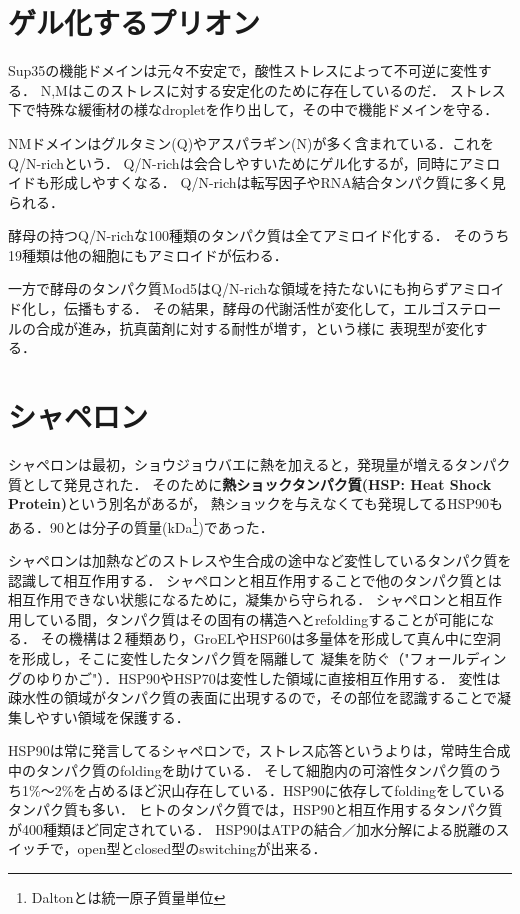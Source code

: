 \documentclass[uplatex, dvipdfmx]{jsreport}
\begin{document}
\section{ゲル化するプリオン}

Sup35の機能ドメインは元々不安定で，酸性ストレスによって不可逆に変性する．
N,Mはこのストレスに対する安定化のために存在しているのだ．
ストレス下で特殊な緩衝材の様なdropletを作り出して，その中で機能ドメインを守る．

\begin{definition}[Q/N-rich]
    NMドメインはグルタミン(Q)やアスパラギン(N)が多く含まれている．これをQ/N-richという．
    Q/N-richは会合しやすいためにゲル化するが，同時にアミロイドも形成しやすくなる．
    Q/N-richは転写因子やRNA結合タンパク質に多く見られる．
\end{definition}
\begin{example}
    酵母の持つQ/N-richな100種類のタンパク質は全てアミロイド化する．
    そのうち19種類は他の細胞にもアミロイドが伝わる．
\end{example}
\begin{example}
    一方で酵母のタンパク質Mod5はQ/N-richな領域を持たないにも拘らずアミロイド化し，伝播もする．
    その結果，酵母の代謝活性が変化して，エルゴステロールの合成が進み，抗真菌剤に対する耐性が増す，という様に
    表現型が変化する．
\end{example}

\section{シャペロン}

シャペロンは最初，ショウジョウバエに熱を加えると，発現量が増えるタンパク質として発見された．
そのために\textbf{熱ショックタンパク質(HSP: Heat Shock Protein)}という別名があるが，
熱ショックを与えなくても発現してるHSP90もある．90とは分子の質量(kDa\footnote{Daltonとは統一原子質量単位})であった．

\begin{definition}[chaperone]
    シャペロンは加熱などのストレスや生合成の途中など変性しているタンパク質を認識して相互作用する．
    シャペロンと相互作用することで他のタンパク質とは相互作用できない状態になるために，凝集から守られる．
    シャペロンと相互作用している間，タンパク質はその固有の構造へとrefoldingすることが可能になる．
    その機構は２種類あり，GroELやHSP60は多量体を形成して真ん中に空洞を形成し，そこに変性したタンパク質を隔離して
    凝集を防ぐ（"フォールディングのゆりかご"）．HSP90やHSP70は変性した領域に直接相互作用する．
    変性は疎水性の領域がタンパク質の表面に出現するので，その部位を認識することで凝集しやすい領域を保護する．

    HSP90は常に発言してるシャペロンで，ストレス応答というよりは，常時生合成中のタンパク質のfoldingを助けている．
    そして細胞内の可溶性タンパク質のうち1\%〜2\%を占めるほど沢山存在している．HSP90に依存してfoldingをしているタンパク質も多い．
    ヒトのタンパク質では，HSP90と相互作用するタンパク質が400種類ほど同定されている．
    HSP90はATPの結合／加水分解による脱離のスイッチで，open型とclosed型のswitchingが出来る．
\end{definition}
\end{document}
